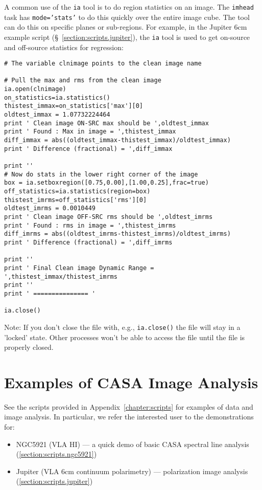 A common use of the {\tt ia} tool is to do region statistics on
an image.  The {\tt imhead} task has {\tt mode='stats'} to do
this quickly over the entire image cube.  The tool can do this
on specific planes or sub-regions.  For example, in the Jupiter
6cm example script (\S~\ref{section:scripts.jupiter}), 
the {\tt ia} tool is used to get on-source and off-source statistics
for regression:
\small
\begin{verbatim}
# The variable clnimage points to the clean image name

# Pull the max and rms from the clean image
ia.open(clnimage)
on_statistics=ia.statistics()
thistest_immax=on_statistics['max'][0]
oldtest_immax = 1.07732224464
print ' Clean image ON-SRC max should be ',oldtest_immax
print ' Found : Max in image = ',thistest_immax
diff_immax = abs((oldtest_immax-thistest_immax)/oldtest_immax)
print ' Difference (fractional) = ',diff_immax

print ''
# Now do stats in the lower right corner of the image
box = ia.setboxregion([0.75,0.00],[1.00,0.25],frac=true)
off_statistics=ia.statistics(region=box)
thistest_imrms=off_statistics['rms'][0]
oldtest_imrms = 0.0010449
print ' Clean image OFF-SRC rms should be ',oldtest_imrms
print ' Found : rms in image = ',thistest_imrms
diff_imrms = abs((oldtest_imrms-thistest_imrms)/oldtest_imrms)
print ' Difference (fractional) = ',diff_imrms

print ''
print ' Final Clean image Dynamic Range = ',thistest_immax/thistest_imrms
print ''
print ' =============== '

ia.close()

\end{verbatim}
\normalsize

Note: If you don't close the file with, e.g., {\tt ia.close()} the
file will stay in a 'locked' state. Other processes won't be able to
access the file until the file is properly closed. 

\section{Examples of CASA Image Analysis}
\label{section:analysis.examples}

See the scripts provided in Appendix~\ref{chapter:scripts} for examples of
data and image analysis.  In particular, we refer
the interested user to the demonstrations for:
\begin{itemize}
\item NGC5921 (VLA HI) --- a quick demo of basic CASA spectral line analysis
      (\ref{section:scripts.ngc5921})
\item Jupiter (VLA 6cm continuum polarimetry) --- polarization image analysis
      (\ref{section:scripts.jupiter})
\end{itemize}

